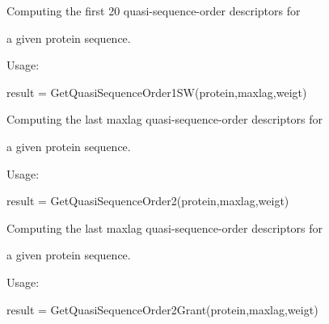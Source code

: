 \documentclass[letterpaper,10pt,english]{sphinxmanual}
\begin{document}

\begin{fulllineitems}
\label{reference/QuasiSequenceOrder:QuasiSequenceOrder.GetQuasiSequenceOrder1SW}
Computing the first 20 quasi-sequence-order descriptors for

a given protein sequence.

Usage:

result = GetQuasiSequenceOrder1SW(protein,maxlag,weigt)

\end{fulllineitems}


\begin{fulllineitems}
\label{reference/QuasiSequenceOrder:QuasiSequenceOrder.GetQuasiSequenceOrder2}
Computing the last maxlag quasi-sequence-order descriptors for

a given protein sequence.

Usage:

result = GetQuasiSequenceOrder2(protein,maxlag,weigt)

\end{fulllineitems}


\begin{fulllineitems}
\label{reference/QuasiSequenceOrder:QuasiSequenceOrder.GetQuasiSequenceOrder2Grant}
Computing the last maxlag quasi-sequence-order descriptors for

a given protein sequence.

Usage:

result = GetQuasiSequenceOrder2Grant(protein,maxlag,weigt)

\end{fulllineitems}
\end{document}

